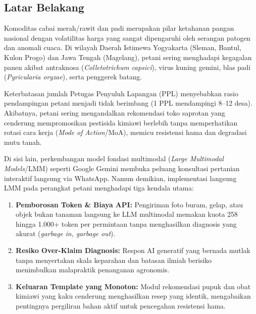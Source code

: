 \documentclass[11pt,a4paper]{article}
\begin{document}
\subsection{Latar Belakang}
Komoditas cabai merah/rawit dan padi merupakan pilar ketahanan pangan nasional dengan volatilitas harga yang sangat dipengaruhi oleh serangan patogen dan anomali cuaca. Di wilayah Daerah Istimewa Yogyakarta (Sleman, Bantul, Kulon Progo) dan Jawa Tengah (Magelang), petani sering menghadapi kegagalan panen akibat antraknosa (\textit{Colletotrichum capsici}), virus kuning gemini, blas padi (\textit{Pyricularia oryzae}), serta penggerek batang.

Keterbatasan jumlah Petugas Penyuluh Lapangan (PPL) menyebabkan rasio pendampingan petani menjadi tidak berimbang (1 PPL mendampingi 8--12 desa). Akibatnya, petani sering mengandalkan rekomendasi toko saprotan yang cenderung mempromosikan pestisida kimiawi berlebih tanpa memperhatikan rotasi cara kerja (\textit{Mode of Action}/MoA), memicu resistensi hama dan degradasi mutu tanah.

Di sisi lain, perkembangan model fondasi multimodal (\textit{Large Multimodal Models}/LMM) seperti Google Gemini membuka peluang konsultasi pertanian interaktif langsung via WhatsApp. Namun demikian, implementasi langsung LMM pada perangkat petani menghadapi tiga kendala utama:
\begin{enumerate}
    \item \textbf{Pemborosan Token \& Biaya API:} Pengiriman foto buram, gelap, atau objek bukan tanaman langsung ke LLM multimodal memakan kuota 258 hingga 1.000+ token per permintaan tanpa menghasilkan diagnosis yang akurat (\textit{garbage in, garbage out}).
    \item \textbf{Resiko Over-Klaim Diagnosis:} Respon AI generatif yang bernada mutlak tanpa menyertakan skala keparahan dan batasan ilmiah berisiko menimbulkan malapraktik penanganan agronomis.
    \item \textbf{Keluaran Template yang Monoton:} Modul rekomendasi pupuk dan obat kimiawi yang kaku cenderung menghasilkan resep yang identik, mengabaikan pentingnya pergiliran bahan aktif untuk pencegahan resistensi hama.
\end{enumerate}
\end{document}
